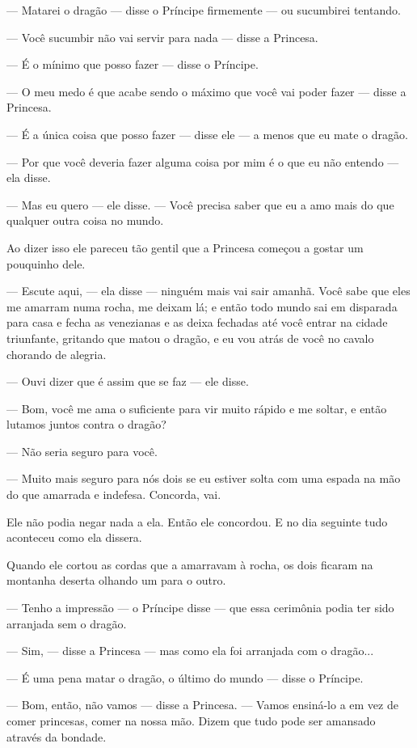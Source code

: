 — Matarei o dragão — disse o Príncipe firmemente — ou sucumbirei
tentando. 

— Você sucumbir não vai servir para nada — disse a Princesa. 

— É o mínimo que posso fazer — disse o Príncipe.

— O meu medo é que acabe sendo o máximo que você vai poder fazer —
disse a Princesa.

— É a única coisa que posso fazer — disse ele — a menos que eu mate o
dragão.

— Por que você deveria fazer alguma coisa por mim é o que eu não
entendo — ela disse.

— Mas eu quero — ele disse. — Você precisa saber que eu a amo mais do
que qualquer outra coisa no mundo. 

Ao dizer isso ele pareceu tão gentil que a Princesa começou a gostar
um pouquinho dele.

— Escute aqui, — ela disse — ninguém mais vai sair amanhã. Você sabe
que eles me amarram numa rocha, me deixam lá; e então todo mundo sai
em disparada para casa e fecha as venezianas e as deixa fechadas até
você entrar na cidade triunfante, gritando que matou o dragão, e eu
vou atrás de você no cavalo chorando de alegria.

— Ouvi dizer que é assim que se faz — ele disse.

— Bom, você me ama o suficiente para vir muito rápido e me soltar, e
então lutamos juntos contra o dragão?

— Não seria seguro para você.

— Muito mais seguro para nós dois se eu estiver solta com uma espada
na mão do que amarrada e indefesa. Concorda, vai.

Ele não podia negar nada a ela. Então ele concordou. E no dia seguinte
tudo aconteceu como ela dissera. 

Quando ele cortou as cordas que a amarravam à rocha, os dois ficaram
na montanha deserta olhando um para o outro.

— Tenho a impressão — o Príncipe disse — que essa cerimônia podia ter
sido arranjada sem o dragão.

— Sim, — disse a Princesa — mas como ela foi arranjada com o dragão...

— É uma pena matar o dragão, o último do mundo — disse o Príncipe.

— Bom, então, não vamos — disse a Princesa. — Vamos ensiná-lo a em vez
de comer princesas, comer na nossa mão. Dizem que tudo pode ser
amansado através da bondade.

